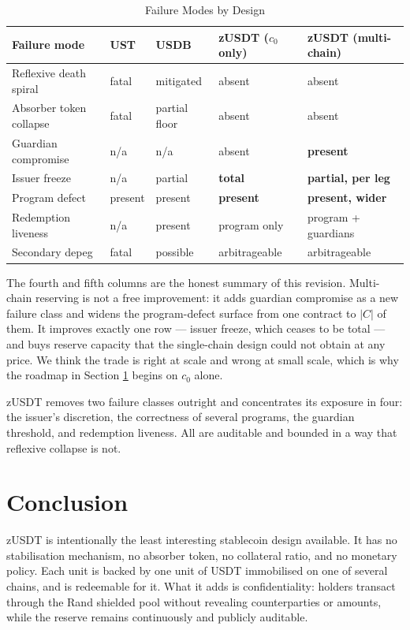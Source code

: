 \documentclass[11pt,a4paper]{article}
\begin{document}
\begin{table}[H]
\centering
\caption{Failure Modes by Design}
\begin{tabular}{@{}lllll@{}}
\toprule
\textbf{Failure mode} & \textbf{UST} & \textbf{USDB} & \textbf{zUSDT ($c_0$ only)} & \textbf{zUSDT (multi-chain)} \\ \midrule
Reflexive death spiral & fatal & mitigated & absent & absent \\
Absorber token collapse & fatal & partial floor & absent & absent \\
Guardian compromise & n/a & n/a & absent & \textbf{present} \\
Issuer freeze & n/a & partial & \textbf{total} & \textbf{partial, per leg} \\
Program defect & present & present & \textbf{present} & \textbf{present, wider} \\
Redemption liveness & n/a & present & program only & program + guardians \\
Secondary depeg & fatal & possible & arbitrageable & arbitrageable \\ \bottomrule
\end{tabular}
\end{table}

The fourth and fifth columns are the honest summary of this revision. Multi-chain reserving is not a free improvement: it adds guardian compromise as a new failure class and widens the program-defect surface from one contract to $|C|$ of them. It improves exactly one row --- issuer freeze, which ceases to be total --- and buys reserve capacity that the single-chain design could not obtain at any price. We think the trade is right at scale and wrong at small scale, which is why the roadmap in Section \ref{sec:conclusion} begins on $c_0$ alone.

zUSDT removes two failure classes outright and concentrates its exposure in four: the issuer's discretion, the correctness of several programs, the guardian threshold, and redemption liveness. All are auditable and bounded in a way that reflexive collapse is not.

\section{Conclusion}
\label{sec:conclusion}

zUSDT is intentionally the least interesting stablecoin design available. It has no stabilisation mechanism, no absorber token, no collateral ratio, and no monetary policy. Each unit is backed by one unit of USDT immobilised on one of several chains, and is redeemable for it. What it adds is confidentiality: holders transact through the Rand shielded pool without revealing counterparties or amounts, while the reserve remains continuously and publicly auditable.
\end{document}
